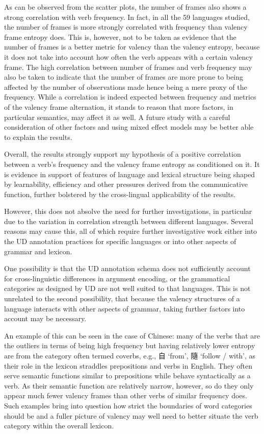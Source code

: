 As can be observed from the scatter plots, the number of frames also shows a strong correlation with verb frequency. In fact, in all the 59 languages studied, the number of frames is more strongly correlated with frequency than valency frame entropy does. This is, however, not to be taken as evidence that the number of frames is a better metric for valency than the valency entropy, because it does not take into account how often the verb appears with a certain valency frame. The high correlation between number of frames and verb frequency may also be taken to indicate that the number of frames are more prone to being affected by the number of observations made hence being a mere proxy of the frequency. While a correlation is indeed expected between frequency and metrics of the valency frame alternation, it stands to reason that more factors, in particular semantics, may affect it as well. A future study with a careful consideration of other factors and using mixed effect models may be better able to explain the results.

Overall, the results strongly support my hypothesis of a positive correlation between a verb's frequency and the valency frame entropy as conditioned on it. It is evidence in support of features of language and lexical structure being shaped by learnability, efficiency and other pressures derived from the communicative function, further bolstered by the cross-lingual applicability of the results. 

However, this does not absolve the need for further investigations, in particular due to the variation in correlation strength between different languages. Several reasons may cause this, all of which require further investigative work either into the UD annotation practices for specific languages or into other aspects of grammar and lexicon. 

One possibility is that the UD annotation schema does not sufficiently account for cross-linguistic differences in argument encoding, or the grammatical categories as designed by UD are not well suited to that languages. This is not unrelated to the second possibility, that because the valency structures of a language interacts with other aspects of grammar, taking further factors into account may be necessary.

An example of this can be seen in the case of Chinese: many of the verbs that are the outliers in terms of being high frequency but having relatively lower entropy are from the category often termed coverbs, e.g., 自 `from', 隨 `follow / with', as their role in the lexicon straddles prepositions and verbs in English. They often serve semantic functions similar to prepositions while behave syntactically as a verb. As their semantic function are relatively narrow, however, so do they only appear much fewer valency frames than other verbs of similar frequency does. Such examples bring into question how strict the boundaries of word categories should be and a fuller picture of valency may well need to better situate the verb category within the overall lexicon.

